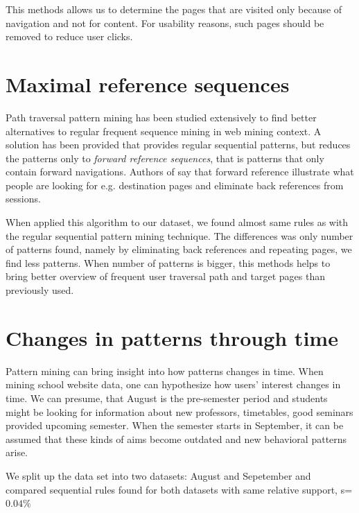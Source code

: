 \documentclass[english,a4paper]{article}
\begin{document}
This methods allows us to determine the pages that are visited only because of navigation and not for content. For usability reasons, such pages should be removed to reduce user clicks.





\section{Maximal reference sequences}
Path traversal pattern mining has been studied extensively to find better alternatives to regular frequent sequence mining in web mining context. A solution has been provided \cite{path_patterns} that provides regular sequential patterns, but reduces the patterns only to \emph{forward reference sequences}, that is patterns that only contain forward navigations. Authors of \cite{path_patterns} say that forward reference illustrate what people are looking for e.g. destination pages and eliminate back references from sessions.

When applied this algorithm to our dataset, we found almost same rules as with the regular sequential pattern mining technique. The differences was only number of patterns found, namely by eliminating back references and repeating pages, we find less patterns. When  number of patterns is bigger, this methods helps to bring better overview of frequent user traversal path and target pages than previously used.

\section{Changes in patterns through time} 
Pattern mining can bring insight into how patterns changes in time. When mining school website data, one can hypothesize how users' interest changes in time. We can presume, that August is the pre-semester period and students might be looking for information about new professors, timetables, good seminars provided upcoming semester. When the semester starts in September, it can be assumed that these kinds of aims become outdated and new behavioral patterns arise.

We split up the data set into two datasets: August and  Sepetember and compared sequential rules found for both datasets with same relative support, s=$0.04\%$
\end{document}
